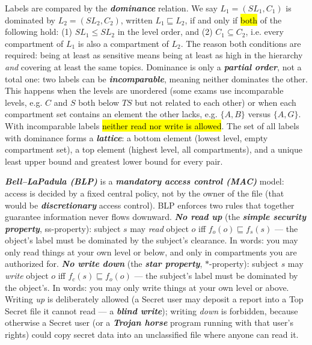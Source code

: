 \documentclass[12pt, a4paper]{article}
\newcommand{\term}[1]{\textbf{\textit{#1}}}        %
\newcommand{\imp}[1]{\hl{#1}}                       %
\begin{document}
Labels are compared by the \term{dominance} relation. We say $L_1 = (SL_1, C_1)$ is dominated by $L_2 = (SL_2, C_2)$, written $L_1 \sqsubseteq L_2$, if and only if \imp{both} of the following hold: (1) $SL_1 \leq SL_2$ in the level order, and (2) $C_1 \subseteq C_2$, i.e. every compartment of $L_1$ is also a compartment of $L_2$. The reason both conditions are required: being at least as sensitive means being at least as high in the hierarchy \emph{and} covering at least the same topics. Dominance is only a \term{partial order}, not a total one: two labels can be \term{incomparable}, meaning neither dominates the other. This happens when the levels are unordered (some exams use incomparable levels, e.g. $C$ and $S$ both below $TS$ but not related to each other) or when each compartment set contains an element the other lacks, e.g. $\{A, B\}$ versus $\{A, G\}$. With incomparable labels \imp{neither read nor write is allowed}. The set of all labels with dominance forms a \term{lattice}: a bottom element (lowest level, empty compartment set), a top element (highest level, all compartments), and a unique least upper bound and greatest lower bound for every pair.

\term{Bell--LaPadula (BLP)} is a \term{mandatory access control (MAC)} model: access is decided by a fixed central policy, not by the owner of the file (that would be \term{discretionary} access control). BLP enforces two rules that together guarantee information never flows downward. \term{No read up} (the \term{simple security property}, ss-property): subject $s$ may \emph{read} object $o$ iff $f_o(o) \sqsubseteq f_s(s)$ --- the object's label must be dominated by the subject's clearance. In words: you may only read things at your own level or below, and only in compartments you are authorized for. \term{No write down} (the \term{star property}, $*$-property): subject $s$ may \emph{write} object $o$ iff $f_c(s) \sqsubseteq f_o(o)$ --- the subject's label must be dominated by the object's. In words: you may only write things at your own level or above. Writing \emph{up} is deliberately allowed (a Secret user may deposit a report into a Top Secret file it cannot read --- a \term{blind write}); writing \emph{down} is forbidden, because otherwise a Secret user (or a \term{Trojan horse} program running with that user's rights) could copy secret data into an unclassified file where anyone can read it.
\end{document}
